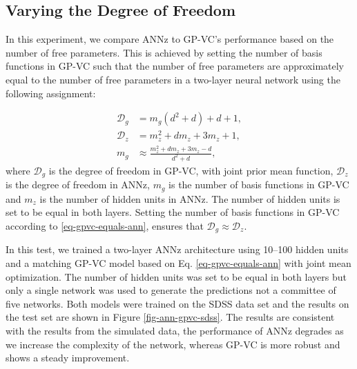 \documentclass[useAMS,usenatbib,fleqn]{mn2e}
\begin{document}
\subsection{Varying the Degree of Freedom}

In this experiment, we compare {\sc ANNz} to GP-VC's performance based on the number of free parameters. This is achieved by setting the number of basis functions in GP-VC such that the number of free parameters are approximately equal to the number of free parameters in a two-layer neural network using the following assignment:

\begin{subequations}
\begin{align}
\label{eq-gpvc-degree}
\mathcal{D}_{g}		&=		m_{g}\left(d^{2}+d\right)+d+1,\\
\label{eq-ann-degree}
\mathcal{D}_{z}	&=		m_{z}^{2}+dm_{z}+3m_{z}+1,\\
\label{eq-gpvc-equals-ann}
m_{g}		&\approx 	\frac{m_{z}^{2}+dm_{z}+3m_{z}-d}{d^{2}+d},
\end{align}
\end{subequations}
where $\mathcal{D}_{g}$ is the degree of freedom in GP-VC, with joint prior mean function, $\mathcal{D}_{z}$ is the degree of freedom in {\sc ANNz}, $m_{g}$ is the number of basis functions in GP-VC and $m_{z}$ is the number of hidden units in {\sc ANNz}. The number of hidden units is set to be equal in both layers. Setting the number of basis functions in GP-VC according to \eqref{eq-gpvc-equals-ann}, ensures that $\mathcal{D}_{g} \approx \mathcal{D}_{z}$.

In this test, we trained a two-layer {\sc ANNz} architecture using 10--100 hidden units and a matching GP-VC model based on Eq. \eqref{eq-gpvc-equals-ann} with joint mean optimization. The number of hidden units was set to be equal in both layers but only a single network was used to generate the predictions not a committee of five networks. Both models were trained on the SDSS data set and the results on the test set are shown in Figure \ref{fig-ann-gpvc-sdss}. The results are consistent with the results from the simulated data, the performance of {\sc ANNz} degrades as we increase the complexity of the network, whereas GP-VC is more robust and shows a steady improvement.
\end{document}
